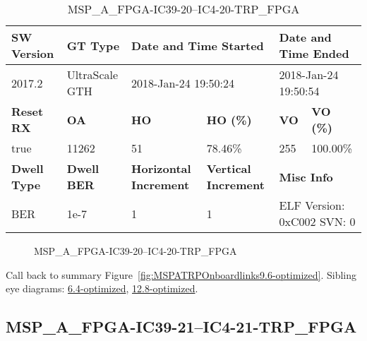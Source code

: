 \begin{table}[h]
\centering
\caption{MSP\_A\_FPGA-IC39-20--IC4-20-TRP\_FPGA}
\label{tab:MSPAFPGAIC3920IC420TRPFPGA9.6-optimized}
\begin{tabular}{@{}|l|l|l|l|l|l|@{}}
\toprule
\textbf{SW Version}                & \textbf{GT Type}   & \multicolumn{2}{l|}{\textbf{Date and Time Started}}            & \multicolumn{2}{l|}{\textbf{Date and Time Ended}}        \\ \midrule
2017.2                       & UltraScale GTH          & \multicolumn{2}{l|}{2018-Jan-24 19:50:24}                   & \multicolumn{2}{l|}{2018-Jan-24 19:50:54}               \\ \midrule
\textbf{Reset RX}                  & \textbf{OA} & \textbf{HO}   & \textbf{HO (\%)} & \textbf{VO} & \textbf{VO (\%)} \\ \midrule
true & 11262        & 51          & 78.46\%        & 255        & 100.00\%       \\ \midrule
\textbf{Dwell Type}                & \textbf{Dwell BER} & \textbf{Horizontal Increment} & \textbf{Vertical Increment}    & \multicolumn{2}{l|}{\textbf{Misc Info}}                  \\ \midrule
BER                            & 1e-7        & 1        & 1           & \multicolumn{2}{l|}{ELF Version: 0xC002 SVN: 0}                         \\ \bottomrule
\end{tabular}
\end{table}

\begin{figure}[h]
\caption{MSP\_A\_FPGA-IC39-20--IC4-20-TRP\_FPGA} \label{fig:MSPAFPGAIC3920IC420TRPFPGA9.6-optimized}
\end{figure}

Call back to summary Figure~\ref{fig:MSPATRPOnboardlinks9.6-optimized}.
Sibling eye diagrams: \hyperref[sec:MSPAFPGAIC3920IC420TRPFPGA6.4-optimized]{6.4-optimized}, \hyperref[sec:MSPAFPGAIC3920IC420TRPFPGA12.8-optimized]{12.8-optimized}.

\clearpage
\newpage


\subsection{MSP\_A\_FPGA-IC39-21--IC4-21-TRP\_FPGA}\label{sec:MSPAFPGAIC3921IC421TRPFPGA9.6-optimized}

